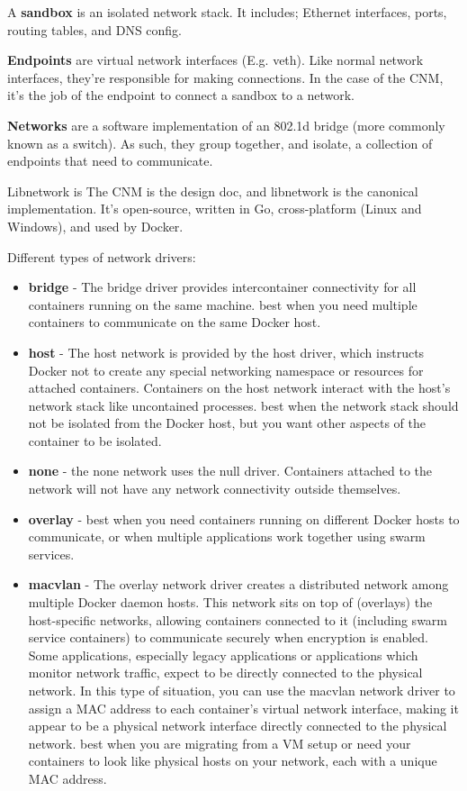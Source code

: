 
A \textbf{sandbox} is an isolated network stack. It includes; Ethernet interfaces, ports, routing tables, and DNS config.

\textbf{Endpoints} are virtual network interfaces (E.g. veth). Like normal network interfaces, they're responsible for making connections. In the case of the CNM, it's the job of the endpoint to connect a sandbox to a network.

\textbf{Networks} are a software implementation of an 802.1d bridge (more commonly known as a switch). As such, they group together, and isolate, a collection of endpoints that need to communicate.

Libnetwork is The CNM is the design doc, and libnetwork is the canonical implementation. It's open-source, written in Go, cross-platform (Linux and Windows), and used by Docker.

Different types of network drivers:

\begin{itemize}
    \item \textbf{bridge} - The bridge driver provides intercontainer connectivity for all containers running on the same machine. best when you need multiple containers to communicate on the same Docker host.
    \item \textbf{host} - The host network is provided by the host driver, which instructs Docker not to create any special networking namespace or resources for attached containers. Containers on the host network interact with the host's network stack like uncontained processes. best when the network stack should not be isolated from the Docker host, but you want other aspects of the container to be isolated.
    \item \textbf{none} - the none network uses the null driver. Containers attached to the network will not have any network connectivity outside themselves.
    \item \textbf{overlay} - best when you need containers running on different Docker hosts to communicate, or when multiple applications work together using swarm services.
    \item \textbf{macvlan} - The overlay network driver creates a distributed network among multiple Docker daemon hosts. This network sits on top of (overlays) the host-specific networks, allowing containers connected to it (including swarm service containers) to communicate securely when encryption is enabled. Some applications, especially legacy applications or applications which monitor network traffic, expect to be directly connected to the physical network. In this type of situation, you can use the macvlan network driver to assign a MAC address to each container's virtual network interface, making it appear to be a physical network interface directly connected to the physical network. best when you are migrating from a VM setup or need your containers to look like physical hosts on your network, each with a unique MAC address.
\end{itemize}

